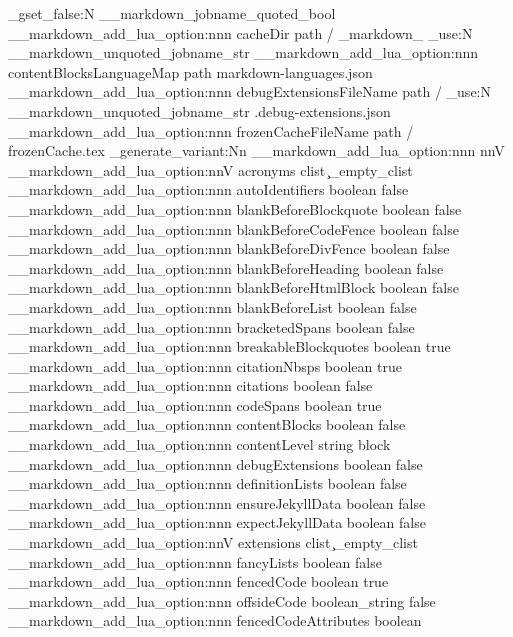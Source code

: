   {
    \bool_gset_false:N
      \g__markdown_jobname_quoted_bool
  }
\__markdown_add_lua_option:nnn
  { cacheDir }
  { path }
  {
    \markdownOptionOutputDir
    / _markdown_
    \str_use:N
      \g__markdown_unquoted_jobname_str
  }
\__markdown_add_lua_option:nnn
  { contentBlocksLanguageMap }
  { path }
  { markdown-languages.json }
\__markdown_add_lua_option:nnn
  { debugExtensionsFileName }
  { path }
  {
    \markdownOptionOutputDir
    /
    \str_use:N
      \g__markdown_unquoted_jobname_str
    .debug-extensions.json
  }
\__markdown_add_lua_option:nnn
  { frozenCacheFileName }
  { path }
  { \markdownOptionCacheDir / frozenCache.tex }
\cs_generate_variant:Nn
  \__markdown_add_lua_option:nnn
  { nnV }
\__markdown_add_lua_option:nnV
  { acronyms }
  { clist }
  \c_empty_clist
\__markdown_add_lua_option:nnn
  { autoIdentifiers }
  { boolean }
  { false }
\__markdown_add_lua_option:nnn
  { blankBeforeBlockquote }
  { boolean }
  { false }
\__markdown_add_lua_option:nnn
  { blankBeforeCodeFence }
  { boolean }
  { false }
\__markdown_add_lua_option:nnn
  { blankBeforeDivFence }
  { boolean }
  { false }
\__markdown_add_lua_option:nnn
  { blankBeforeHeading }
  { boolean }
  { false }
\__markdown_add_lua_option:nnn
  { blankBeforeHtmlBlock }
  { boolean }
  { false }
\__markdown_add_lua_option:nnn
  { blankBeforeList }
  { boolean }
  { false }
\__markdown_add_lua_option:nnn
  { bracketedSpans }
  { boolean }
  { false }
\__markdown_add_lua_option:nnn
  { breakableBlockquotes }
  { boolean }
  { true }
\__markdown_add_lua_option:nnn
  { citationNbsps }
  { boolean }
  { true }
\__markdown_add_lua_option:nnn
  { citations }
  { boolean }
  { false }
\__markdown_add_lua_option:nnn
  { codeSpans }
  { boolean }
  { true }
\__markdown_add_lua_option:nnn
  { contentBlocks }
  { boolean }
  { false }
\__markdown_add_lua_option:nnn
  { contentLevel }
  { string }
  { block }
\__markdown_add_lua_option:nnn
  { debugExtensions }
  { boolean }
  { false }
\__markdown_add_lua_option:nnn
  { definitionLists }
  { boolean }
  { false }
\__markdown_add_lua_option:nnn
  { ensureJekyllData }
  { boolean }
  { false }
\__markdown_add_lua_option:nnn
  { expectJekyllData }
  { boolean }
  { false }
\__markdown_add_lua_option:nnV
  { extensions }
  { clist }
  \c_empty_clist
\__markdown_add_lua_option:nnn
  { fancyLists }
  { boolean }
  { false }
\__markdown_add_lua_option:nnn
  { fencedCode }
  { boolean }
  { true }
\__markdown_add_lua_option:nnn
  { offsideCode }
  { boolean_string }
  { false }
\__markdown_add_lua_option:nnn
  { fencedCodeAttributes }
  { boolean }

